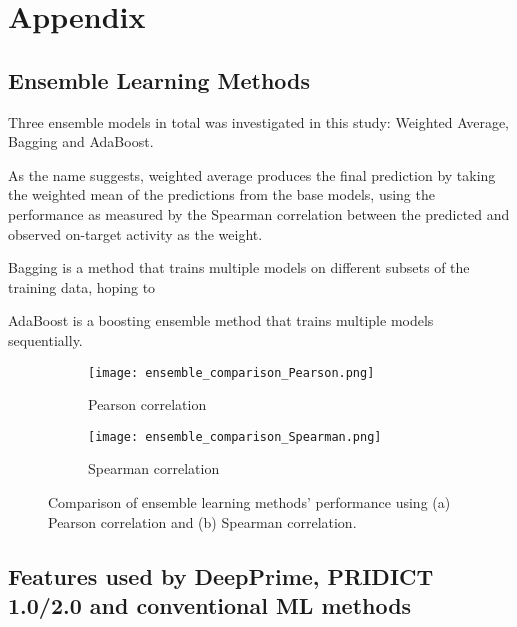 \section{Appendix}

\subsection{Ensemble Learning Methods}
\label{appendix:ensemble}

Three ensemble models in total was investigated in this study: Weighted Average, Bagging and AdaBoost. 

As the name suggests, weighted average produces the final prediction by taking the weighted mean of the predictions from the base models, using the performance as measured by the Spearman correlation between the predicted and observed on-target activity as the weight. 

Bagging is a method that trains multiple models on different subsets of the training data, hoping to 

AdaBoost is a boosting ensemble method that trains multiple models sequentially. 

\begin{figure}[h]
    \centering
    \begin{subfigure}{0.4\textwidth}
        \centering
        \texttt{[image: ensemble\_comparison\_Pearson.png]}
        \caption{Pearson correlation}
    \end{subfigure}
    \begin{subfigure}{0.4\textwidth}
        \centering
        \texttt{[image: ensemble\_comparison\_Spearman.png]}
        \caption{Spearman correlation}
    \end{subfigure}
    \caption{Comparison of ensemble learning methods' performance using (a) Pearson correlation and (b) Spearman correlation.}
    \label{fig:ensemble_comparison}
\end{figure}


\subsection{Features used by DeepPrime, PRIDICT 1.0/2.0 and conventional ML methods}

